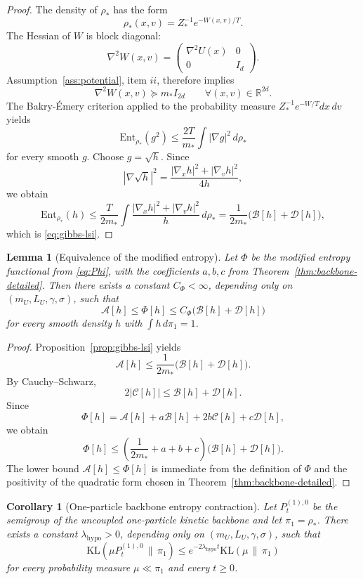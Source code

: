 \documentclass[11pt]{article}
\newtheorem{lemma}[theorem]{Lemma}
\newtheorem{corollary}[theorem]{Corollary}
\theoremstyle{definition}
\theoremstyle{remark}
\newcommand{\R}{\mathbb{R}}
\newcommand{\KL}{\mathrm{KL}}
\newcommand{\Ent}{\mathrm{Ent}}
\begin{document}
\begin{proof}
The density of $\rho_*$ has the form
\[
\rho_*(x,v)=Z_*^{-1}e^{-W(x,v)/T}.
\]
The Hessian of $W$ is block diagonal:
\[
\nabla^2 W(x,v)=
\begin{pmatrix}
\nabla^2 U(x) & 0\\
0 & I_d
\end{pmatrix}.
\]
Assumption~\ref{ass:potential}, item $ii$, therefore implies
\[
\nabla^2 W(x,v)\succeq m_* I_{2d}
\qquad
\forall (x,v)\in\R^{2d}.
\]
The Bakry-\'Emery criterion applied to the probability measure
$Z_*^{-1}e^{-W/T}dx\,dv$ yields
\[
\Ent_{\rho_*}(g^2)\leq \frac{2T}{m_*}\int |\nabla g|^2\,d\rho_*
\]
for every smooth $g$. Choose $g=\sqrt h$. Since
\[
|\nabla \sqrt h|^2
=
\frac{|\nabla_x h|^2+|\nabla_v h|^2}{4h},
\]
we obtain
\[
\Ent_{\rho_*}(h)
\leq
\frac{T}{2m_*}
\int \frac{|\nabla_x h|^2+|\nabla_v h|^2}{h}\,d\rho_*
=
\frac{1}{2m_*}\bigl(\mathcal B[h]+\mathcal D[h]\bigr),
\]
which is \eqref{eq:gibbs-lsi}.
\end{proof}

\begin{lemma}[Equivalence of the modified entropy]\label{lem:phi-equiv}
Let \(\Phi\) be the modified entropy functional from \eqref{eq:Phi}, with the
coefficients \(a,b,c\) from Theorem~\ref{thm:backbone-detailed}. Then there
exists a constant \(C_\Phi<\infty\), depending only on
\((m_U,L_U,\gamma,\sigma)\), such that
\[
\mathcal A[h]\le \Phi[h]
\le
C_\Phi\bigl(\mathcal B[h]+\mathcal D[h]\bigr)
\]
for every smooth density \(h\) with \(\int h\,d\pi_1=1\).
\end{lemma}

\begin{proof}
Proposition~\ref{prop:gibbs-lsi} yields
\[
\mathcal A[h]\le \frac{1}{2m_*}\bigl(\mathcal B[h]+\mathcal D[h]\bigr).
\]
By Cauchy--Schwarz,
\[
2|\mathcal C[h]|\le \mathcal B[h]+\mathcal D[h].
\]
Since
\[
\Phi[h]=\mathcal A[h]+a\mathcal B[h]+2b\mathcal C[h]+c\mathcal D[h],
\]
we obtain
\[
\Phi[h]
\le
\left(\frac{1}{2m_*}+a+b+c\right)\bigl(\mathcal B[h]+\mathcal D[h]\bigr).
\]
The lower bound \(\mathcal A[h]\le \Phi[h]\) is immediate from the definition
of \(\Phi\) and the positivity of the quadratic form chosen in
Theorem~\ref{thm:backbone-detailed}.
\end{proof}

\begin{corollary}[One-particle backbone entropy contraction]\label{cor:backbone-gap}
Let $P_t^{(1),0}$ be the semigroup of the uncoupled one-particle kinetic
backbone and let $\pi_1=\rho_*$. There exists a constant
$\lambda_{\mathrm{hypo}}>0$, depending only on
$(m_U,L_U,\gamma,\sigma)$, such that
\[
\KL(\mu P_t^{(1),0}\,\|\,\pi_1)
\leq
e^{-2\lambda_{\mathrm{hypo}}t}\KL(\mu\,\|\,\pi_1)
\]
for every probability measure $\mu\ll\pi_1$ and every $t\geq0$.
\end{corollary}
\end{document}
